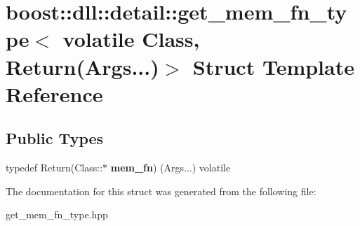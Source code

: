 \hypertarget{a00135}{}\section{boost\+:\+:dll\+:\+:detail\+:\+:get\+\_\+mem\+\_\+fn\+\_\+type$<$ volatile Class, Return(Args...)$>$ Struct Template Reference}
\label{a00135}
\subsection*{Public Types}
\begin{DoxyCompactItemize}
\item 
typedef Return(Class\+::$\ast$ {\bfseries mem\+\_\+fn}) (Args...) volatile\hypertarget{a00135_a2650686f0a64897ada9a29c2f55f8f86}{}\label{a00135_a2650686f0a64897ada9a29c2f55f8f86}

\end{DoxyCompactItemize}


The documentation for this struct was generated from the following file\+:\begin{DoxyCompactItemize}
\item 
get\+\_\+mem\+\_\+fn\+\_\+type.\+hpp\end{DoxyCompactItemize}
